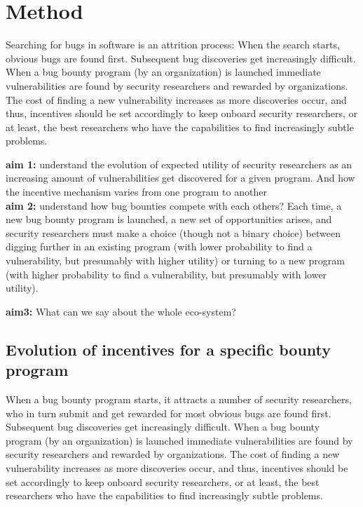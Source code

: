 \section{Method}
\label{sec:method}
Searching for bugs in software is an attrition process: When the search starts, obvious bugs are found first. Subsequent bug discoveries get increasingly difficult. When a bug bounty program (by an organization) is launched immediate vulnerabilities are found by security researchers and rewarded by organizations. The cost of finding a new vulnerability increases as more discoveries occur, and thus, incentives should be set accordingly to keep onboard security researchers, or at least, the best researchers who have the capabilities to find increasingly subtle problems. 

{\bf aim 1:} understand the evolution of expected utility of security researchers as an increasing amount of vulnerabilities get discovered for a given program. And how the incentive mechanism varies from one program to another\\

{\bf aim 2:} understand how bug bounties compete with each others? Each time, a new bug bounty program is launched, a new set of opportunities arises, and security researchers must make a choice (though not a binary choice) between digging further in an existing program (with lower probability to find a vulnerability, but presumably with higher utility) or turning to a new program (with higher probability to find a vulnerability, but presumably with lower utility).

{\bf aim3: } What can we say about the whole eco-system?

\subsection{Evolution of incentives for a specific bounty program}
When a bug bounty program starts, it attracts a number of security researchers, who in turn submit and get rewarded for most obvious bugs are found first. Subsequent bug discoveries get increasingly difficult. When a bug bounty program (by an organization) is launched immediate vulnerabilities are found by security researchers and rewarded by organizations. The cost of finding a new vulnerability increases as more discoveries occur, and thus, incentives should be set accordingly to keep onboard security researchers, or at least, the best researchers who have the capabilities to find increasingly subtle problems. 

